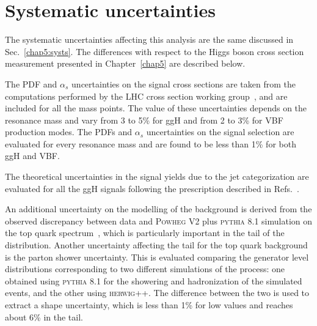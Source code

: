 \section{Systematic uncertainties}\label{chap6:Systematics}

The systematic uncertainties affecting this analysis are the same discussed in Sec.~\ref{chap5:systs}. The differences with respect to the Higgs boson cross section measurement presented in Chapter~\ref{chap5} are described below.

The PDF and $\alpha_s$ uncertainties on the signal cross sections are taken from the computations performed by the LHC cross section working group~\cite{YRtmp}, and are included for all the mass points. The value of these uncertainties depends on the resonance mass and vary from 3 to 5\% for ggH and from 2 to 3\% for VBF production modes. The PDFs and $\alpha_{s}$ uncertainties on the signal selection are evaluated for every resonance mass and are found to be less than 1\% for both ggH and VBF.

The theoretical uncertainties in the signal yields due to the jet categorization are evaluated for all the ggH signals following the prescription described in Refs.~\cite{Stewart:2011cf,Heinemeyer:2013tqa}.

An additional uncertainty on the modelling of the \ttbar background is derived from the observed discrepancy between data and \textsc{Powheg V2} plus \textsc{pythia 8.1} simulation on the top quark \pt spectrum~\cite{Khachatryan:2015oqa}, which is particularly important in the tail of the \mti distribution. Another uncertainty affecting the \mti tail for the top quark background is the parton shower uncertainty. This is evaluated comparing the generator level \mti distributions corresponding to two different simulations of the \ttbar process: one obtained using \textsc{pythia 8.1} for the showering and hadronization of the simulated events, and the other using \textsc{herwig++}. The difference between the two is used to extract a shape uncertainty, which is less than 1\% for low \mti values and reaches about 6\% in the \mti tail.






